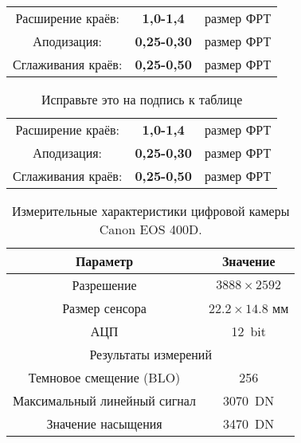 \documentclass[a4paper,12pt]{report} %
\begin{document}
    \begin{center}
        \begin{tabular}{ccc}
            Расширение краёв: & \textbf{1,0-1,4} & размер ФРТ \\
            Аподизация: & \textbf{0,25-0,30}& размер ФРТ \\
            Сглаживания краёв: & \textbf{0,25-0,50}& размер ФРТ \\
        \end{tabular}
        \begin{table}[H]
            \caption{Исправьте это на подпись к таблице}
            \label{tabular:timesandtenses}
            \begin{center}
                \begin{tabular}{ccc}
                Расширение краёв: & \textbf{1,0-1,4} & размер ФРТ \\
                Аподизация: & \textbf{0,25-0,30}& размер ФРТ \\
                Сглаживания краёв: & \textbf{0,25-0,50}& размер ФРТ \\
                \end{tabular}
            \end{center}
        \end{table}
    \end{center}
    \begin{table}[H]
        \caption{\label{tab:canonsummary}Измерительные характеристики цифровой камеры Canon EOS 400D.}
        \begin{center}
            \begin{tabular}{|c|c|}
                \hline
                Параметр & Значение \\
                \hline
                Разрешение & $3888 \times 2592$ \\
                Размер сенсора & $22.2 \times 14.8$ мм \\
                АЦП & 12~bit\\
                \hline
                \multicolumn{2}{|c|}{Результаты измерений} \\
                \hline
                Темновое смещение (BLO) & 256 \\
                Максимальный линейный сигнал & 3070~DN \\
                Значение насыщения & 3470~DN \\
                \hline
            \end{tabular}
        \end{center}
    \end{table}
\end{document}
